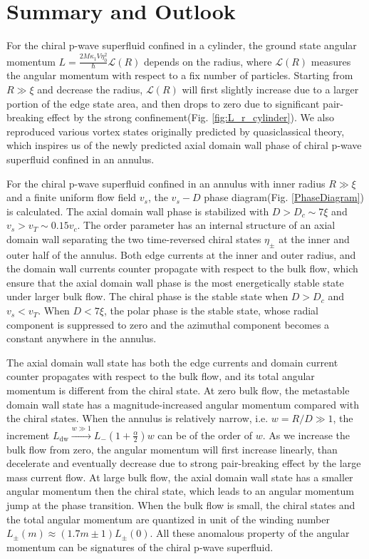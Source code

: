\documentclass[aps,prb,reprint,groupedaddress]{revtex4-2}
\begin{document}
\section{Summary and Outlook}\label{sec:summary}

For the chiral p-wave superfluid confined in a cylinder,
the ground state angular momentum
$L = \frac{2M\kappa_1V\eta_0^2}{\hbar} \mathcal{L}(R)$ depends on the radius,
where $\mathcal{L}(R)$ measures the angular momentum with respect to a fix
number of particles. Starting from $R\gg\xi$ and decrease the radius, $\mathcal{L}(R)$
will first slightly increase due to a larger portion of the edge state area, and
then drops to zero due to significant pair-breaking effect by the strong
confinement(Fig. \ref{fig:L_r_cylinder}). We also reproduced various vortex states
originally predicted by quasiclassical theory, which inspires us of the newly
predicted axial domain wall phase of chiral p-wave superfluid confined in an annulus.

For the chiral p-wave superfluid confined in an annulus with inner radius
$R\gg\xi$ and a finite uniform flow field $v_s$, the $v_s-D$ phase
diagram(Fig. \ref{PhaseDiagram}) is calculated.
The axial domain wall phase is stabilized with $D>D_c\sim7\xi$ and $v_s>v_T\sim0.15v_c$.
The order parameter has an internal structure of an axial domain wall separating
the two time-reversed chiral states $\eta_\pm$ at the inner and outer half of the annulus.
Both edge currents at the inner and outer radius, and the domain wall currents counter
propagate with respect to the bulk flow, which ensure that the axial domain wall phase
is the most energetically stable state under larger bulk flow. The chiral phase is
the stable state when $D>D_c$ and $v_s<v_T$. When $D<7\xi$, the polar phase is the stable
state, whose radial component is suppressed to zero and the azimuthal component
becomes a constant anywhere in the annulus.

The axial domain wall state has both the edge currents and domain current counter propagates
with respect to the bulk flow, and its total angular momentum is different from the chiral
state. At zero bulk flow, the metastable domain wall state has a magnitude-increased
angular momentum compared with the chiral states. When the annulus is relatively narrow,
i.e. $w=R/D\gg1$, the increment $L_{\text{dw}}\xrightarrow{w\gg 1}
    L_-\left(1+\frac{\alpha}{2}\right)w$ can be of the order of $w$.
As we increase the bulk flow from zero, the angular momentum
will first increase linearly, than decelerate and eventually decrease due to strong
pair-breaking effect by the large mass current flow. At large bulk flow, the axial
domain wall state has a smaller angular momentum then the chiral state, which leads to
an angular momentum jump at the phase transition. When the bulk flow is small, the
chiral states and the total angular momentum are quantized in unit of the winding number
$L_\pm(m)\approx(1.7m\pm 1)L_\pm(0)$. All these anomalous property of the angular
momentum can be signatures of the chiral p-wave superfluid.
\end{document}
